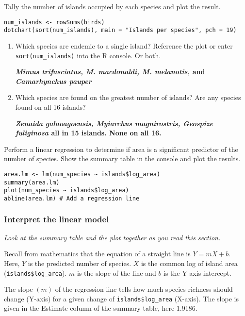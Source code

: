\documentclass[11pt]{article}
\begin{document}
Tally the number of islands occupied by each species and plot the result.

\begin{verbatim}
num_islands <- rowSums(birds)
dotchart(sort(num_islands), main = "Islands per species", pch = 19)
\end{verbatim}

\medskip


\begin{enumerate}[resume]
\item Which species are endemic to a single island? Reference the plot or enter \texttt{sort(num\_islands)} into the R console. Or both.

\textbf{\textit{Mimus trifasciatus, M. macdonaldi, M. melanotis,} and \textit{Camarhynchus pauper}}

\vspace{2\baselineskip}

\item Which species are found on the greatest number of islands? Are any species found on all 16 islands?

\textbf{\textit{Zenaida galaoagoensis, Myiarchus magnirostris, Geospize fuliginosa} all in 15 islands. None on all 16.}

\end{enumerate}

Perform a linear regression to determine if area is a significant predictor of the number of species. Show the summary table in the console and plot the results.

\begin{verbatim}
area.lm <- lm(num_species ~ islands$log_area)
summary(area.lm)
plot(num_species ~ islands$log_area)
abline(area.lm) # Add a regression line
\end{verbatim}

\subsubsection*{Interpret the linear model}

\emph{Look at the summary table and the plot together as you read this section.}

Recall from mathematics that the equation of a straight line is $Y = mX + b.$ Here, $Y$ is the predicted number of species. $X$ is the common log of island area (\texttt{islands\$log\_area}).  $m$ is the slope of the line and $b$ is the Y-axis intercept. 

The slope $(m)$ of the regression line tells how much species richness should change (Y-axis) for a given change of \texttt{islands\$log\_area} (X-axis). The slope is given in the Estimate column of the summary table, here 1.9186. 
\end{document}
